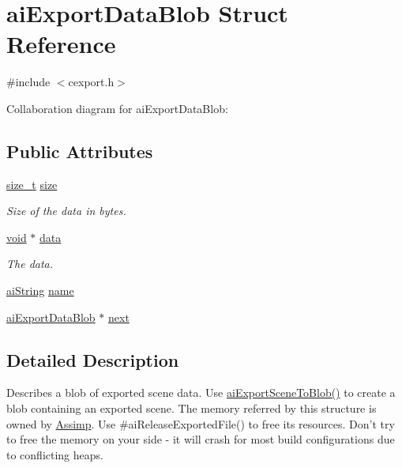 \hypertarget{structai_export_data_blob}{\section{ai\-Export\-Data\-Blob Struct Reference}
\label{structai_export_data_blob}
}


{\ttfamily \#include $<$cexport.\-h$>$}



Collaboration diagram for ai\-Export\-Data\-Blob\-:
\subsection*{Public Attributes}
\begin{DoxyCompactItemize}
\item 
\hyperlink{_s_d_l__config_8h_a7c94ea6f8948649f8d181ae55911eeaf}{size\-\_\-t} \hyperlink{structai_export_data_blob_a339bfaacc70396b2f99f94c1bc3b808f}{size}
\begin{DoxyCompactList}\small\item\em Size of the data in bytes. \end{DoxyCompactList}\item 
\hyperlink{_s_d_l__opengl_8h_a3db05964a3cc4410f35b7ea2b7eb850d}{void} $\ast$ \hyperlink{structai_export_data_blob_ac080c780dad92077b42447d77a1a9ed1}{data}
\begin{DoxyCompactList}\small\item\em The data. \end{DoxyCompactList}\item 
\hyperlink{structai_string}{ai\-String} \hyperlink{structai_export_data_blob_a22fbdb28a7ebc30b4d3c3339be18b5f2}{name}
\item 
\hyperlink{structai_export_data_blob}{ai\-Export\-Data\-Blob} $\ast$ \hyperlink{structai_export_data_blob_a73baa3d77f95f360540b0b1922075ba5}{next}
\end{DoxyCompactItemize}


\subsection{Detailed Description}
Describes a blob of exported scene data. Use \hyperlink{cexport_8h_a33b02f2dbfd79980bf29e62f3a64139f}{ai\-Export\-Scene\-To\-Blob()} to create a blob containing an exported scene. The memory referred by this structure is owned by \hyperlink{namespace_assimp}{Assimp}. Use \#ai\-Release\-Exported\-File() to free its resources. Don't try to free the memory on your side -\/ it will crash for most build configurations due to conflicting heaps.

